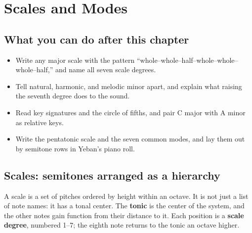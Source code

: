 \clearpage
\chapter{Scales and Modes}


\label{sec:scales-and-modes}

\section*{What you can do after this chapter}
\begin{itemize}
  \item Write any major scale with the pattern ``whole--whole--half--whole--whole--whole--half,'' and name all seven scale degrees.
  \item Tell natural, harmonic, and melodic minor apart, and explain what raising the seventh degree does to the sound.
  \item Read key signatures and the circle of fifths, and pair C major with A minor as relative keys.
  \item Write the pentatonic scale and the seven common modes, and lay them out by semitone rows in Yeban's piano roll.
\end{itemize}

\section{Scales: semitones arranged as a hierarchy}

A scale is a set of pitches ordered by height within an octave. It is not just a list of note names: it has a tonal center. The \textbf{tonic} is the center of the system, and the other notes gain function from their distance to it. Each position is a \textbf{scale degree}, numbered 1--7; the eighth note returns to the tonic an octave higher.

